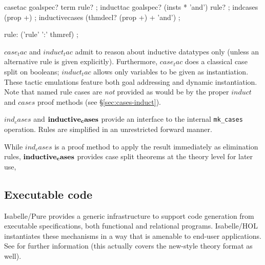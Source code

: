 



\begin{rail}
  casetac goalspec? term rule?
  ;
  inducttac goalspec? (insts * 'and') rule?
  ;
  indcases (prop +)
  ;
  inductivecases (thmdecl? (prop +) + 'and')
  ;

  rule: ('rule' ':' thmref)
  ;
\end{rail}

\begin{descr}
\item [$case_tac$ and $induct_tac$] admit to reason about inductive datatypes
  only (unless an alternative rule is given explicitly).  Furthermore,
  $case_tac$ does a classical case split on booleans; $induct_tac$ allows only
  variables to be given as instantiation.  These tactic emulations feature
  both goal addressing and dynamic instantiation.  Note that named rule cases
  are \emph{not} provided as would be by the proper $induct$ and $cases$ proof
  methods (see \S\ref{sec:cases-induct}).
  
\item [$ind_cases$ and ${\mathord{\mathbf{inductive_cases}}}$] provide an interface
  to the internal \texttt{mk_cases} operation.  Rules are simplified in an
  unrestricted forward manner.

  While $ind_cases$ is a proof method to apply the result immediately as
  elimination rules, ${\mathord{\mathbf{inductive_cases}}}$ provides case split
  theorems at the theory level for later use,
\end{descr}


\subsection{Executable code}

Isabelle/Pure provides a generic infrastructure to support code generation
from executable specifications, both functional and relational programs.
Isabelle/HOL instantiates these mechanisms in a way that is amenable to
end-user applications.  See \cite{isabelle-HOL} for further information (this
actually covers the new-style theory format as well).


